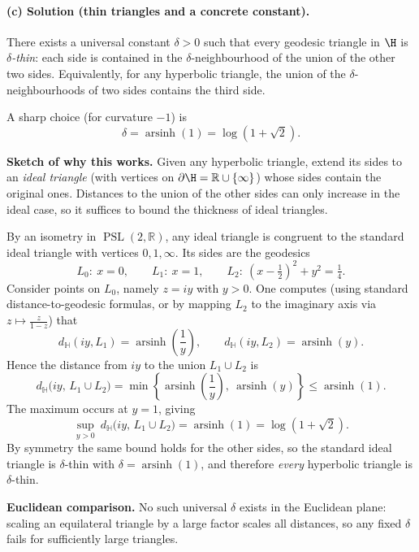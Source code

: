 \documentclass[12pt,a4paper]{article}
\newcommand{\hyp}{\mathbb{H}}
\newcommand{\R}{\mathbb{R}}
\DeclareMathOperator{\PSL}{PSL}
\DeclareMathOperator{\arsinh}{arsinh}
\theoremstyle{plain}
\theoremstyle{definition}      %
\begin{document}
	\paragraph{(c) Solution (thin triangles and a concrete constant).}
	There exists a universal constant $\delta>0$ such that every geodesic triangle in
	$\H$ is \emph{$\delta$-thin}: each side is contained in the $\delta$-neighbourhood
	of the union of the other two sides. Equivalently, for any hyperbolic triangle,
	the union of the $\delta$-neighbourhoods of two sides contains the third side.
	
	A sharp choice (for curvature $-1$) is
	\[
	\delta=\arsinh(1)=\log(1+\sqrt2).
	\]
	
	\medskip
	\noindent\textbf{Sketch of why this works.}
	Given any hyperbolic triangle, extend its sides to an \emph{ideal triangle} (with
	vertices on $\partial\H=\R\cup\{\infty\}$) whose sides contain the original ones.
	Distances to the union of the other sides can only increase in the ideal case,
	so it suffices to bound the thickness of ideal triangles.
	
	By an isometry in $\PSL(2,\R)$, any ideal triangle is congruent to the standard
	ideal triangle with vertices $0,1,\infty$.
	Its sides are the geodesics
	\[
	L_0:\ x=0,\qquad L_1:\ x=1,\qquad L_2:\ (x-\tfrac12)^2+y^2=\tfrac14.
	\]
	Consider points on $L_0$, namely $z=iy$ with $y>0$.
	One computes (using standard distance-to-geodesic formulas, or by mapping $L_2$
	to the imaginary axis via $z\mapsto \frac{z}{1-z}$) that
	\[
	d_{\hyp}(iy,L_1)=\arsinh\!\left(\frac1y\right),
	\qquad
	d_{\hyp}(iy,L_2)=\arsinh(y).
	\]
	Hence the distance from $iy$ to the union $L_1\cup L_2$ is
	\[
	d_{\hyp}\bigl(iy,\,L_1\cup L_2\bigr)
	=\min\!\left\{\arsinh\!\left(\frac1y\right),\ \arsinh(y)\right\}
	\le \arsinh(1).
	\]
	The maximum occurs at $y=1$, giving
	\[
	\sup_{y>0}\ d_{\hyp}\bigl(iy,\,L_1\cup L_2\bigr)=\arsinh(1)=\log(1+\sqrt2).
	\]
	By symmetry the same bound holds for the other sides, so the standard ideal
	triangle is $\delta$-thin with $\delta=\arsinh(1)$, and therefore \emph{every}
	hyperbolic triangle is $\delta$-thin.
	
	\medskip
	\noindent\textbf{Euclidean comparison.}
	No such universal $\delta$ exists in the Euclidean plane: scaling an equilateral
	triangle by a large factor scales all distances, so any fixed $\delta$ fails for
	sufficiently large triangles.
	
	
\end{document}

